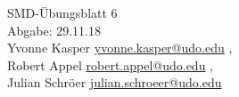


\begin{center}
{\huge SMD-Übungsblatt 6} \\
\vspace{1cm}
Abgabe: 29.11.18 \\
\vspace{.5cm}
  Yvonne Kasper
  \texorpdfstring{
    \href{mailto:authorA@udo.edu}{yvonne.kasper@udo.edu}
  }{},\\
  Robert Appel%
  \texorpdfstring{
    \href{mailto:authorB@udo.edu}{robert.appel@udo.edu}
  }{},\\
  Julian Schröer%
  \texorpdfstring{
    \href{mailto:authorB@udo.edu}{julian.schroeer@udo.edu}
  }{}
\end{center}


%


\printbibliography


